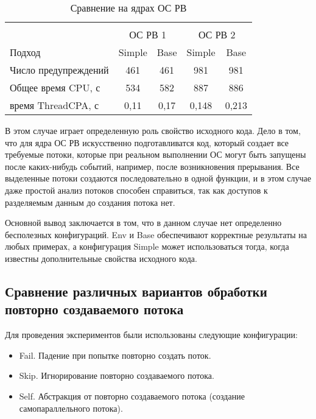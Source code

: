   \begin{table}[h]\footnotesize \centering
    \caption{Сравнение на ядрах ОС РВ}
  	\label{table-os-thread}
    \begin{tabular}{ | l | c | c | c | c |}
      \hline
      		& 		\multicolumn{4}{c|}{\combatmode}  \\
      		& 		\multicolumn{2}{c|}{ОС РВ 1} & \multicolumn{2}{c|}{ОС РВ 2} 	\\
      Подход         					& Simple 	& Base 	& Simple 	& Base 		\\ \hline
      Число предупреждений 				& 461    	& 461   & 981     	& 981  		\\ 
      Общее время CPU, с				& 534      	& 582   & 887     	& 886  		\\ 
  \hspace{0.5cm} время ThreadCPA, с 	& 0,11 		& 0,17  & 0,148    	& 0,213   	\\
      \hline
    \end{tabular}
  \end{table}

В этом случае играет определенную роль свойство исходного кода.
Дело в том, что для ядра ОС РВ искусственно подготавливатся код, который создает все требуемые потоки, которые при реальном выполнении ОС могут быть запущены после каких-нибудь событий, например, после возникновения прерывания.
Все выделенные потоки создаются последовательно в одной функции, и в этом случае даже простой анализ потоков способен справиться, так как доступов к разделяемым данным до создания потока нет.

Основной вывод заключается в том, что в данном случае нет определенно бесполезных конфигураций. 
Env и Base обеспечивают корректные результаты на любых примерах, а конфигурация Simple может использоваться тогда, когда известны дополнительные свойства исходного кода.


\subsection{Сравнение различных вариантов обработки повторно создаваемого потока }

Для проведения экспериментов были использованы следующие конфигурации:

\begin{itemize}
\item Fail. Падение при попытке повторно создать поток.
\item Skip. Игнорирование повторно создаваемого потока.
\item Self. Абстракция от повторно создаваемого потока (создание самопараллельного потока).
\end{itemize}

